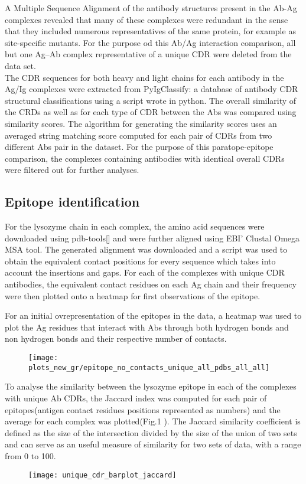\documentclass{article}
\begin{document}
A Multiple Sequence Alignment of the antibody structures present in the Ab-Ag complexes revealed that many of these complexes were redundant in the sense that they included numerous representatives of the same protein, for example as site-specific mutants.  For the purpose od this Ab/Ag interaction comparison, all but one Ag–Ab complex representative of a unique CDR were deleted from the data set.
 \\
The CDR sequences for both heavy and light chains for each antibody in the Ag/Ig complexes were extracted from PyIgClassify: a database of antibody CDR structural classifications using a script wrote in python. The overall similarity of the CRDs as well as for each type of CDR between the Abs was compared using similarity scores. The algorithm for generating the similarity scores uses an averaged string matching score computed for each pair of CDRs from two different Abs pair in the dataset. 
For the purpose of this paratope-epitope comparison, the complexes containing antibodies with identical overall CDRs were filtered out for further analyses.

\subsection{Epitope identification}
For the lysozyme chain in each complex, the amino acid sequences were downloaded using pdb-tools[] and were further aligned using EBI' Clustal Omega MSA tool. The generated alignment was downloaded and a script was used to obtain the equivalent contact positions for every sequence which takes into account the insertions and gaps. For each of the complexes with unique CDR antibodies, the equivalent contact residues on each Ag chain and their frequency were then plotted onto a heatmap for first observations of the epitope. 


For an initial ovrepresentation of the epitopes in the data, a heatmap was used to plot the Ag residues that interact with Abs through both hydrogen bonds and non hydrogen bonds and their respective number of contacts.
\begin{figure}[h]
	\centering
	\texttt{[image: plots\_new\_gr/epitope\_no\_contacts\_unique\_all\_pdbs\_all\_all]}
	\caption{}
	\label{fig:epitopenocontactsuniqueallpdbsallall}
\end{figure}


To analyse the similarity between the lysozyme epitope in each of the complexes with unique Ab CDRs, the Jaccard index was computed for each pair of epitopes(antigen contact residues positions represented as numbers) and the average for each complex was plotted(Fig.1 ). The Jaccard similarity coefficient is defined as the size of the intersection divided by the size of the union of two sets and can serve as an useful measure of similarity for  two sets of data, with a range from 0 to 100. 
\begin{figure}[h]
	\centering
	\texttt{[image: unique\_cdr\_barplot\_jaccard]}
	\caption[Jaccrad index]{}
	\label{fig:uniquecdrbarplotjaccard}
\end{figure}
\end{document}
